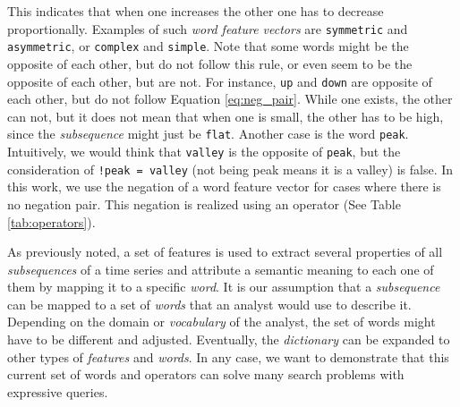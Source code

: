 {This indicates that when one increases the other one has to decrease proportionally. Examples of such \textit{word feature vectors} are \texttt{symmetric} and \texttt{asymmetric}, or \texttt{complex} and \texttt{simple}. Note that some words might be the opposite of each other, but do not follow this rule, or even seem to be the opposite of each other, but are not. For instance, \texttt{up} and \texttt{down} are opposite of each other, but do not follow Equation \ref{eq:neg_pair}. While one exists, the other can not, but it does not mean that when one is small, the other has to be high, since the \textit{subsequence} might just be \texttt{flat}. Another case is the word \texttt{peak}. Intuitively, we would think that \texttt{valley} is the opposite of \texttt{peak}, but the consideration of \texttt{!peak = valley} (not being peak means it is a valley) is false. In this work, we use the negation of a word feature vector for cases where there is no negation pair. This negation is realized using an operator (See Table \ref{tab:operators}).
\par
As previously noted, a set of features is used to extract several properties of all \textit{subsequences} of a time series and attribute a semantic meaning to each one of them by mapping it to a specific \textit{word}. It is our assumption that a \textit{subsequence} can be mapped to a set of \textit{words} that an analyst would use to describe it. Depending on the domain or \textit{vocabulary} of the analyst, the set of words might have to be different and adjusted. Eventually, the \textit{dictionary} can be expanded to other types of \textit{features} and \textit{words}. In any case, we want to demonstrate that this current set of words and operators can solve many search problems with expressive queries.

}
